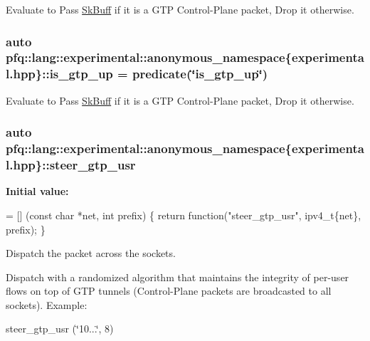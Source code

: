 Evaluate to {\ttfamily Pass} \hyperlink{structpfq_1_1lang_1_1SkBuff}{Sk\+Buff} if it is a G\+TP Control-\/\+Plane packet, {\ttfamily Drop} it otherwise. 

\subsubsection[{\texorpdfstring{is\+\_\+gtp\+\_\+up}{is_gtp_up}}]{\setlength{\rightskip}{0pt plus 5cm}auto pfq\+::lang\+::experimental\+::anonymous\+\_\+namespace\{experimental.\+hpp\}\+::is\+\_\+gtp\+\_\+up = {\bf predicate}(\char`\"{}is\+\_\+gtp\+\_\+up\char`\"{})}\hypertarget{namespacepfq_1_1lang_1_1experimental_1_1anonymous__namespace_02experimental_8hpp_03_a8c12f3cb8c8faaab619e0feb874ed0c3}{}\label{namespacepfq_1_1lang_1_1experimental_1_1anonymous__namespace_02experimental_8hpp_03_a8c12f3cb8c8faaab619e0feb874ed0c3}


Evaluate to {\ttfamily Pass} \hyperlink{structpfq_1_1lang_1_1SkBuff}{Sk\+Buff} if it is a G\+TP Control-\/\+Plane packet, {\ttfamily Drop} it otherwise. 

\subsubsection[{\texorpdfstring{steer\+\_\+gtp\+\_\+usr}{steer_gtp_usr}}]{\setlength{\rightskip}{0pt plus 5cm}auto pfq\+::lang\+::experimental\+::anonymous\+\_\+namespace\{experimental.\+hpp\}\+::steer\+\_\+gtp\+\_\+usr}\hypertarget{namespacepfq_1_1lang_1_1experimental_1_1anonymous__namespace_02experimental_8hpp_03_a6b08a2b49251677736f1939eaadac4a6}{}\label{namespacepfq_1_1lang_1_1experimental_1_1anonymous__namespace_02experimental_8hpp_03_a6b08a2b49251677736f1939eaadac4a6}
{\bfseries Initial value\+:}
\begin{DoxyCode}
= [] (\textcolor{keyword}{const} \textcolor{keywordtype}{char} *net, \textcolor{keywordtype}{int} prefix)
        \{
            \textcolor{keywordflow}{return} \textcolor{keyword}{function}(\textcolor{stringliteral}{"steer\_gtp\_usr"}, ipv4\_t\{net\}, prefix);
        \}
\end{DoxyCode}


Dispatch the packet across the sockets. 

Dispatch with a randomized algorithm that maintains the integrity of per-\/user flows on top of G\+TP tunnels (Control-\/\+Plane packets are broadcasted to all sockets). Example\+:

steer\+\_\+gtp\+\_\+usr (\char`\"{}10...\char`\"{}, 8) 